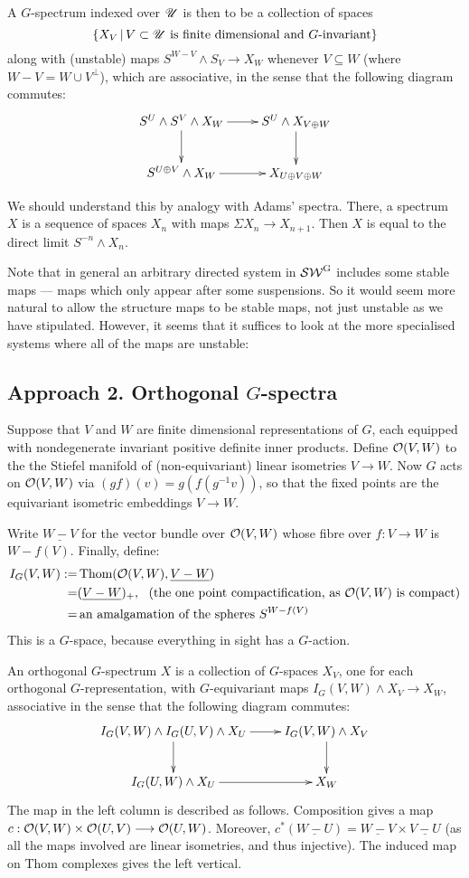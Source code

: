 \documentclass[11pt]{article}
\begin{document}
\begin{defn*}
A $G$-spectrum indexed over $\mathscr{U}$ is then to be a collection of spaces 
\[\{X_V\,|\,V\subset\mathscr{U}\text{ is finite dimensional and $G$-invariant}\}\]
along with (unstable) maps $S^{W-V}\wedge S_V\to X_W$ whenever $V\subseteq W$ (where $W-V=W\cup V^\perp$), which are associative, in the sense that the following diagram commutes:
\[\xymatrix{
\ar[d]S^U\wedge S^V\wedge X_W\ar[r]&S^U\wedge X_{V\oplus W}\ar[d]\\
S^{U\oplus V}\wedge X_W\ar[r]&X_{U\oplus V\oplus W}
}\]
\end{defn*}
We should understand this by analogy with Adams' spectra. There, a spectrum $X$ is a sequence of spaces $X_n$ with maps $\Sigma X_n\to X_{n+1}$. Then $X$ is equal to the direct limit $S^{-n}\wedge X_n$.

Note that in general an arbitrary directed system in $\operatorname{{\mathcal{SW}^G}}$ includes some stable maps --- maps which only appear after some suspensions. So it would seem more natural to allow the structure maps to be stable maps, not just unstable as we have stipulated. However, it seems that it suffices to look at the more specialised systems where all of the maps are unstable:
\subsection*{Approach 2. Orthogonal $G$-spectra}
Suppose that $V$ and $W$ are finite dimensional representations of $G$, each equipped with nondegenerate invariant positive definite inner products. Define $\mathcal{O}(V,W)$ to the the Stiefel manifold of (non-equivariant) linear isometries $V\to W$. Now $G$ acts on $\mathcal{O}(V,W)$ via $(gf)(v)=g(f(g^{-1}v))$, so that the fixed points are the equivariant isometric embeddings $V\to W$.

Write $\underline{W-V}$ for the vector bundle over $\mathcal{O}(V,W)$ whose fibre over $f:V\to W$ is $W-f(V)$. Finally, define:
\begin{alignat*}{2}
I_G(V,W):=&\textup{\,Thom}(\mathcal{O}(V,W),\underline{V-W})\\
=&(\underline{V-W})_+,\text{ \ (the one point compactification, as $\mathcal{O}(V,W)$ is compact)}\\
=&\text{\,an amalgamation of the spheres $S^{W-f(V)}$}
\end{alignat*}
This is a $G$-space, because everything in sight has a $G$-action.
\begin{defn*}
An orthogonal $G$-spectrum $X$ is a collection of $G$-spaces $X_V$, one for each orthogonal $G$-representation, with $G$-equivariant maps $I_G(V,W)\wedge X_V\to X_W$, associative in the sense that the following diagram commutes:
\[\xymatrix{
\ar[d]I_G(V,W)\wedge I_G(U,V)\wedge X_U\ar[r]&I_G(V,W)\wedge X_{V}\ar[d]\\
I_G(U,W)\wedge X_U\ar[r]&X_{W}
}\]
The map in the left column is described as follows. Composition gives a map $c:\mathcal{O}(V,W)\times\mathcal{O}(U,V)\longrightarrow\mathcal{O}(U,W)$. Moreover, $c^*(\underline{W-U})=\underline{W-V}\times\underline{V-U}$ (as all the maps involved are linear isometries, and thus injective). The induced map on Thom complexes gives the left vertical.
\end{defn*}
\end{document}

